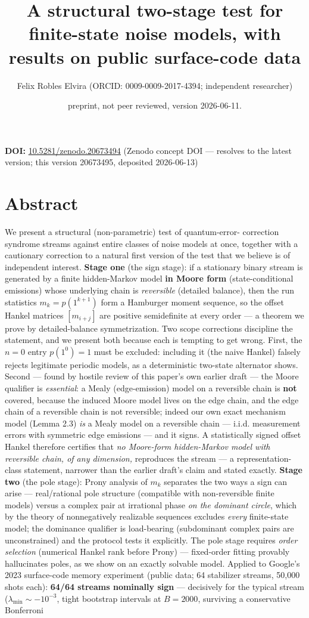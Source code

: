 \documentclass[11pt]{article}
\title{A structural two-stage test for finite-state noise models, with results on public surface-code data}
\author{Felix Robles Elvira (ORCID: 0009-0009-2017-4394; independent researcher)}
\date{\small preprint, not peer reviewed, version 2026-06-11.}
\begin{document}
\maketitle

\textbf{DOI:} \href{https://doi.org/10.5281/zenodo.20673494}{10.5281/zenodo.20673494} (Zenodo concept DOI — resolves to the latest version; this version 20673495, deposited 2026-06-13)

\section*{Abstract}
We present a structural (non-parametric) test of quantum-error- correction syndrome streams against entire classes of noise models at once, together with a cautionary correction to a natural first version of the test that we believe is of independent interest. \textbf{Stage one} (the sign stage): if a stationary binary stream is generated by a finite hidden-Markov model \textbf{in Moore form} (state-conditional emissions) whose underlying chain is \emph{reversible} (detailed balance), then the run statistics $m_k = p(1^{k+1})$ form a Hamburger moment sequence, so the offset Hankel matrices $[m_{i+j}]$ are positive semidefinite at every order — a theorem we prove by detailed-balance symmetrization.  Two scope corrections discipline the statement, and we present both because each is tempting to get wrong.  First, the $n = 0$ entry $p(1^0) = 1$ must be excluded: including it (the naive Hankel) falsely rejects legitimate periodic models, as a deterministic two-state alternator shows.  Second — found by hostile review of this paper's own earlier draft — the Moore qualifier is \emph{essential}: a Mealy (edge-emission) model on a reversible chain is \textbf{not} covered, because the induced Moore model lives on the edge chain, and the edge chain of a reversible chain is not reversible; indeed our own exact mechanism model (Lemma 2.3) \emph{is} a Mealy model on a reversible chain — i.i.d. measurement errors with symmetric edge emissions — and it signs. A statistically signed offset Hankel therefore certifies that \emph{no Moore-form hidden-Markov model with reversible chain, of any dimension,} reproduces the stream — a representation-class statement, narrower than the earlier draft's claim and stated exactly.  \textbf{Stage two} (the pole stage): Prony analysis of $m_k$ separates the two ways a sign can arise — real/rational pole structure (compatible with non-reversible finite models) versus a complex pair at irrational phase \emph{on the dominant circle}, which by the theory of nonnegatively realizable sequences excludes \emph{every} finite-state model; the dominance qualifier is load-bearing (subdominant complex pairs are unconstrained) and the protocol tests it explicitly.  The pole stage requires \emph{order selection} (numerical Hankel rank before Prony) — fixed-order fitting provably hallucinates poles, as we show on an exactly solvable model.  Applied to Google's 2023 surface-code memory experiment (public data; 64 stabilizer streams, 50{,}000 shots each): \textbf{64/64 streams nominally sign} — decisively for the typical stream ($\lambda_{\min} \sim -10^{-3}$, tight bootstrap intervals at $B = 2000$, surviving a conservative Bonferroni 
\end{document}
